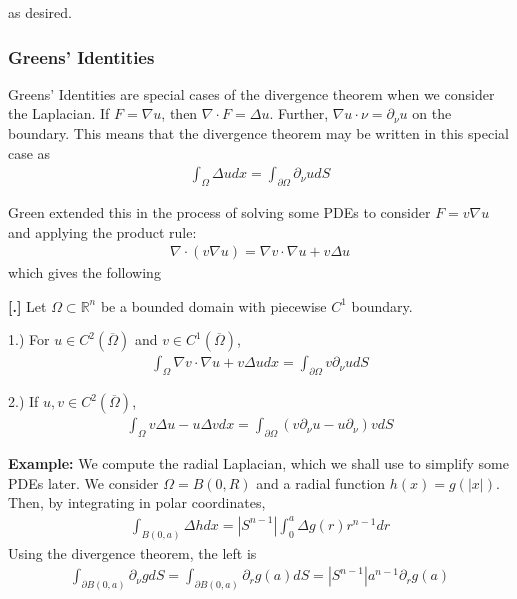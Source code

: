 \documentclass{article}
\newcommand{\R}{{\mathbb{R}}}
\newcommand{\cl}[1]{{\overline{#1}}}
\newcommand{\pd}{\partial}
\newcounter{result}[section]
\newenvironment{res}[1][]{\refstepcounter{result}\par\medskip
	\noindent \textbf{[\thesection.\theresult] #1} \rmfamily}{\medskip}
\begin{document}
	as desired. 
	
	
	\subsubsection{Greens' Identities}
	
	Greens' Identities are special cases of the divergence theorem when we consider the Laplacian. If $F = \nabla u$, then $\nabla \cdot F  = \Delta u$. Further, $\nabla u \cdot \nu = \pd_{\nu} u$ on the boundary. This means that the divergence theorem may be written in this special case as 
	\begin{align*}
		\int_{\Omega} \Delta u dx = \int_{\pd \Omega} \pd_{\nu} u dS
	\end{align*}
	
	Green extended this in the process of solving some PDEs to consider $F = v \nabla u$ and applying the product rule:
	\begin{align*}
		\nabla \cdot (v \nabla u) = \nabla v \cdot \nabla u + v \Delta u 
	\end{align*}
	which gives the following
	
	\begin{res} Let $\Omega \subset \R^{n}$ be a bounded domain with piecewise $C^{1}$ boundary. 
		
	1.) For $u \in C^{2}(\cl{\Omega})$ and $v \in C^{1}(\cl{\Omega})$, 
	\begin{align*}
		\int_{\Omega} \nabla v \cdot \nabla u + v \Delta u dx = \int_{\pd \Omega} v \pd_{\nu} u dS
	\end{align*}
	
	2.) If $u,v \in C^{2}(\cl{\Omega})$, 
	\begin{align*}
		\int_{\Omega} v \Delta u - u \Delta v dx = \int_{\pd \Omega} ( v \pd_{\nu}u - u \pd_{\nu}) v dS
	\end{align*}
	
	\end{res}
	
	\vspace{0.25 cm}
	
	\textbf{Example:}
	We compute the radial Laplacian, which we shall use to simplify some PDEs later. We consider $\Omega = B(0,R)$ and a radial function $h(x) = g(|x|)$. Then, by integrating in polar coordinates,
	\begin{align*}
		\int_{B(0,a)} \Delta h dx = |S^{n-1}| \int_{0}^{a} \Delta g(r)r^{n-1} dr
	\end{align*}
	Using the divergence theorem, the left is 
	\begin{align*}
		\int_{\pd B(0,a)} \pd_{\nu} g dS = \int_{\pd B(0,a)} \pd_{r} g (a) dS = |S^{n-1}|a^{n-1}\pd_{r}g(a)
	\end{align*}
	
\end{document}
